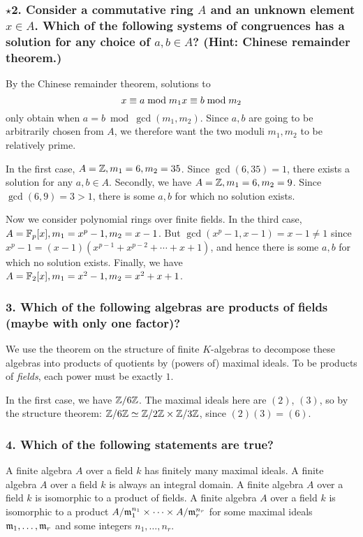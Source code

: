 \subsubsection*{$\star$2. Consider a commutative ring $A$ and an unknown element $x \in A$. Which of the following systems of congruences has a solution for any choice of $a, b \in A$? (Hint: Chinese remainder theorem.)}
By the Chinese remainder theorem, solutions to \[x \equiv a \bmod m_1\\ x \equiv b \bmod m_2\] only obtain when $a = b \bmod \gcd(m_1, m_2)$. Since $a, b$ are going to be arbitrarily chosen from $A$, we therefore want the two moduli $m_1, m_2$ to be relatively prime.

In the first case, $A = \mathbb{Z}, m_1 = 6, m_2 = 35$. Since $\gcd(6, 35) = 1$, there exists a solution for any $a, b \in A$.
Secondly, we have $A = \mathbb{Z}, m_1 = 6, m_2 = 9$. Since $\gcd(6, 9) = 3 > 1$, there is some $a, b$ for which no solution exists.

Now we consider polynomial rings over finite fields. In the third case, $A = \mathbb{F}_p[x], m_1 = x^p - 1, m_2 = x - 1$. But $\gcd(x^p - 1, x - 1) = x - 1 \neq 1$ since $x^p - 1 = (x - 1)(x^{p-1} + x^{p-2} + \dotsb + x + 1)$, and hence there is some $a, b$ for which no solution exists.
Finally, we have $A = \mathbb{F}_2[x], m_1 = x^2 - 1, m_2 = x^2 + x + 1$. 

\subsubsection*{3. Which of the following algebras are products of fields (maybe with only one factor)?}
We use the theorem on the structure of finite $K$-algebras to decompose these algebras into products of quotients by (powers of) maximal ideals. To be products of \emph{fields}, each power must be exactly $1$.

In the first case, we have $\mathbb{Z} / 6\mathbb{Z}$. The maximal ideals here are $(2)$, $(3)$, so by the structure theorem: $\mathbb{Z} / 6\mathbb{Z} \simeq \mathbb{Z} / 2\mathbb{Z} \times \mathbb{Z} / 3\mathbb{Z}$, since $(2)(3) = (6)$.

\subsubsection*{4. Which of the following statements are true?}
A finite algebra $A$ over a field $k$ has finitely many maximal ideals.
A finite algebra $A$ over a field $k$ is always an integral domain.
A finite algebra $A$ over a field $k$ is isomorphic to a product of fields.
A finite algebra $A$ over a field $k$ is isomorphic to a product $A/\mathfrak{m}_1^{n_1} \times \dotsb \times A / \mathfrak{m}_r^{n_r}$ for some maximal ideals $\mathfrak{m}_1,\dotsc, \mathfrak{m}_r$ and some integers $n_1, \dotsc, n_r$.

